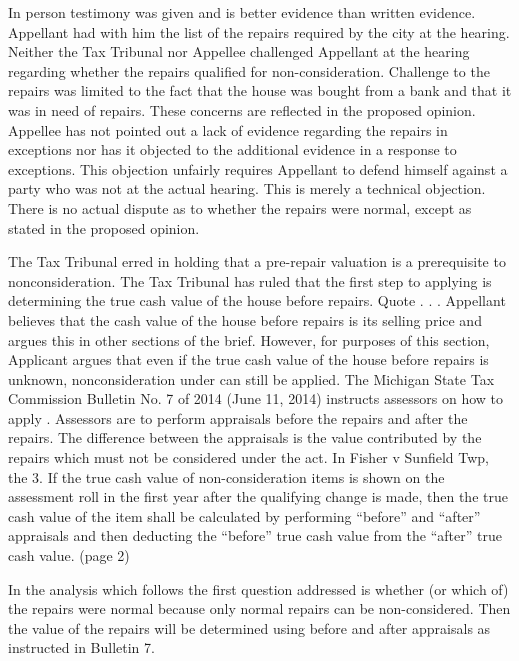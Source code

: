 \documentclass[12pt,\documentclassflag]{michiganCourtOfAppealsBrief}
\begin{document}
In person testimony was given and is better evidence than written evidence.
Appellant had with him the list of the repairs required by the city at the hearing.
Neither the Tax Tribunal nor Appellee challenged Appellant at the hearing regarding whether the repairs qualified for non-consideration.
Challenge to the repairs was limited to the fact that the house was bought from a bank and that it was in need of repairs. These concerns are reflected in the proposed opinion.
Appellee has not pointed out a lack of evidence regarding the repairs in exceptions nor has it objected to the additional evidence in a response to exceptions.
This objection unfairly requires Appellant to defend himself against a party who was not at the actual hearing. 
This is merely a technical objection. There is no actual dispute as to whether the repairs were normal, except as stated in the proposed opinion.
 
The Tax Tribunal erred in holding that a pre-repair valuation is a prerequisite to  nonconsideration.
The Tax Tribunal has ruled that the first step to applying  is determining the true cash value of the house before repairs. Quote . . . 
Appellant believes that the cash value of the house before repairs is its selling price and argues this in other sections of the brief. However, for purposes of this section, Applicant argues that even if the true cash value of the house before repairs is unknown, nonconsideration under  can still be applied. 
The Michigan State Tax Commission Bulletin No. 7 of 2014 (June 11, 2014) instructs assessors on how to apply . Assessors are to perform appraisals before the repairs and after the repairs. The difference between the appraisals is the value contributed by the repairs which must not be considered under the act. 
In Fisher v Sunfield Twp, the 
3. If the true cash value of non-consideration items is shown on the assessment roll in the first year after the qualifying change is made, then the true cash value of the item shall be calculated by performing ``before'' and ``after'' appraisals and then deducting the ``before'' true cash value from the ``after'' true cash value. (page 2)
 
In the analysis which follows the first question addressed is whether (or which of) the repairs were normal because only normal repairs can be non-considered. Then the value of the repairs will be determined using before and after appraisals as instructed in Bulletin 7. 
 
\end{document}
